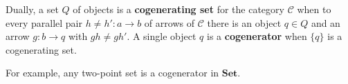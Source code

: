Dually, a set $Q$ of objects is a \textbf{cogenerating set} for the category $\mathcal{C}$ when to every parallel pair $h \neq h' : a \to b$ of arrows of $\mathcal{C}$ there is an object $q \in Q$ and an arrow $g : b \to q$ with $g h \neq g h'$. A single object $q$ is a \textbf{cogenerator} when $\{q\}$ is a cogenerating set.

For example, any two-point set is a cogenerator in $\mathbf{Set}$.
